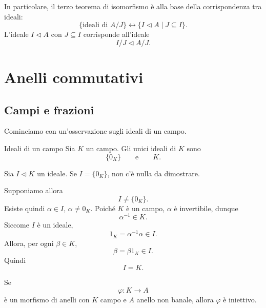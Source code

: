\documentclass[a4paper]{article}
\begin{document}
\begin{radioactive}
In particolare, il terzo teorema di isomorfismo è alla base della corrispondenza tra ideali:
\[
    \{\text{ideali di }A/J\}
    \longleftrightarrow
    \{I\triangleleft A\mid J\subseteq I\}.
\]
L'ideale \(I\triangleleft A\) con \(J\subseteq I\) corrisponde all'ideale
\[
    I/J\triangleleft A/J.
\]
\end{radioactive}

\section{Anelli commutativi}

\subsection{Campi e frazioni}

\begin{radioactive}
Cominciamo con un'osservazione sugli ideali di un campo.
\end{radioactive}

\begin{radioactive}
\begin{snippetproposition}{Ideali di un campo}
    Sia \(K\) un campo. Gli unici ideali di \(K\) sono
    \[
        \{0_K\}
        \qquad
        \text{e}
        \qquad
        K.
    \]
\end{snippetproposition}
\end{radioactive}

\begin{radioactive}
\begin{snippetproof}{}
    Sia \(I\triangleleft K\) un ideale.
    Se \(I=\{0_K\}\), non c'è nulla da dimostrare.

    Supponiamo allora
    \[
        I\neq \{0_K\}.
    \]
    Esiste quindi \(\alpha\in I\), \(\alpha\neq 0_K\). Poiché \(K\) è un campo, \(\alpha\) è invertibile, dunque
    \[
        \alpha^{-1}\in K.
    \]
    Siccome \(I\) è un ideale,
    \[
        1_K=\alpha^{-1}\alpha\in I.
    \]
    Allora, per ogni \(\beta\in K\),
    \[
        \beta=\beta 1_K\in I.
    \]
    Quindi
    \[
        I=K.
    \]
\end{snippetproof}
\end{radioactive}

\begin{radioactive}
\begin{snippetcorollary}{}
    Se
    \[
        \varphi\colon K\to A
    \]
    è un morfismo di anelli con \(K\) campo e \(A\) anello non banale, allora \(\varphi\) è iniettivo.
\end{snippetcorollary}
\end{radioactive}
\end{document}
